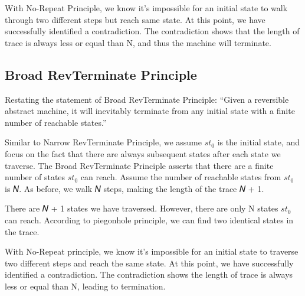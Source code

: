 

With No-Repeat Principle, we know it's impossible for an initial state to walk through two different steps but reach same state.
At this point, we have successfully identified a contradiction.  
The contradiction shows that the length of trace is always less or equal than N, and thus the machine will terminate.

\subsection{ Broad RevTerminate Principle }
Restating the statement of Broad RevTerminate Principle: 
``Given a reversible abstract machine, it will inevitably terminate from any initial state with a finite number of reachable states.''

Similar to Narrow RevTerminate Principle, we assume $st_{0}$ is the initial state, and focus on the fact that there are always subsequent states after each state we traverse.
The Broad RevTerminate Principle asserts that there are a finite number of states $st_{0}$ can reach. 
Assume the number of reachable states from $st_{0}$ is 𝑁.
As before, we walk 𝑁 steps, making the length of the trace 𝑁 + 1.



There are 𝑁 + 1 states we have traversed.  However, there are only N states $st_{0}$ can reach.
According to piegonhole principle, we can find two identical states in the trace.



With No-Repeat principle, we know it's impossible for an initial state to traverse two different steps and reach the same state.
At this point, we have successfully identified a contradiction.  The contradiction shows the length of trace is always less or equal than N, leading to termination.

